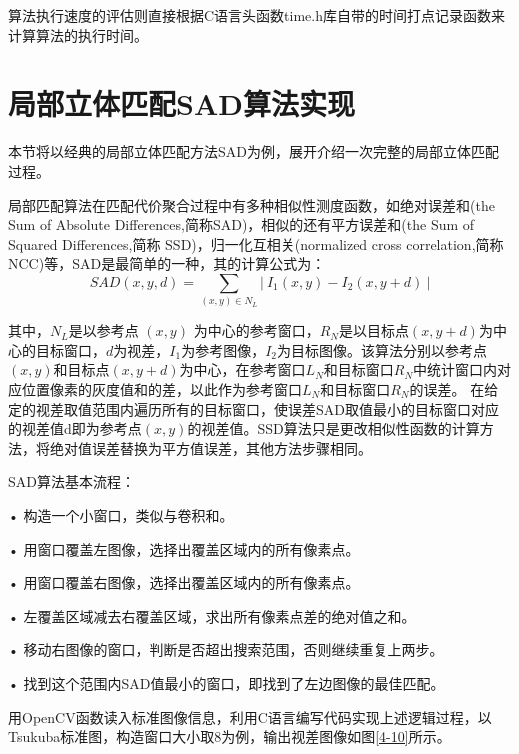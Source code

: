 
算法执行速度的评估则直接根据C语言头函数time.h库自带的时间打点记录函数来计算算法的执行时间。

\section{局部立体匹配SAD算法实现}

本节将以经典的局部立体匹配方法SAD为例，展开介绍一次完整的局部立体匹配过程。


局部匹配算法在匹配代价聚合过程中有多种相似性测度函数，如绝对误差和(the Sum of Absolute Differences,简称SAD)，相似的还有平方误差和(the Sum of Squared Differences,简称 SSD)，归一化互相关(normalized cross correlation,简称 NCC)等，SAD是最简单的一种，其的计算公式为：
\begin{equation}
SAD(x,y,d)=\sum_{(x,y)\in N_{L}} |\ I_{1}(x,y)-I_{2}(x,y+d) \ |
\end{equation}

其中，$N_{L}$是以参考点 $(x,y)$ 为中心的参考窗口，$R_{N}$是以目标点$(x,y+d)$为中心的目标窗口，$d$为视差，$I_{1}$为参考图像，$I_{2}$为目标图像。该算法分别以参考点$(x,y)$和目标点$(x,y+d)$为中心，在参考窗口$L_{N}$和目标窗口$R_{N}$中统计窗口内对应位置像素的灰度值和的差，以此作为参考窗口$L_{N}$和目标窗口$R_{N}$的误差。
在给定的视差取值范围内遍历所有的目标窗口，使误差SAD取值最小的目标窗口对应的视差值d即为参考点$(x,y)$的视差值。SSD算法只是更改相似性函数的计算方法，将绝对值误差替换为平方值误差，其他方法步骤相同。


SAD算法基本流程：

•  构造一个小窗口，类似与卷积和。

•  用窗口覆盖左图像，选择出覆盖区域内的所有像素点。 

•  用窗口覆盖右图像，选择出覆盖区域内的所有像素点。

•  左覆盖区域减去右覆盖区域，求出所有像素点差的绝对值之和。

•  移动右图像的窗口，判断是否超出搜索范围，否则继续重复上两步。

•  找到这个范围内SAD值最小的窗口，即找到了左边图像的最佳匹配。

用OpenCV函数读入标准图像信息，利用C语言编写代码实现上述逻辑过程，以Tsukuba标准图，构造窗口大小取8为例，输出视差图像如图\ref{4-10}所示。

